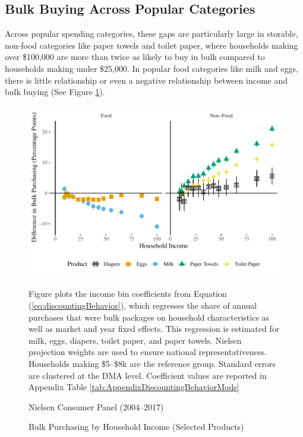 \documentclass[AER]{AEA_mal}
\begin{document}
\subsection{Bulk Buying Across Popular Categories}
\label{appendix:bulkGapCategories}

Across popular spending categories, these gaps are particularly large in storable, non-food categories like paper towels and toilet paper, where households making over \$100,000 are more than twice as likely to buy in bulk compared to households making under \$25,000. In popular food categories like milk and eggs, there is little relationship or even a negative relationship between income and bulk buying (See Figure \ref{fig:savingsBehaviorModules}).

\begin{figure}[!htb]
\centering
\caption{Bulk Purchasing by Household Income (Selected Products)}
\includegraphics[width = 4.8in, height = 3in]{../5_figures/savingsBehaviorModulesColor.pdf}
\begin{figurenotes}
Figure plots the income bin coefficients from Equation (\ref{eq:discountingBehavior}), which regresses the share of annual purchases that were bulk packages on household characteristics as well as market and year fixed effects. This regression is estimated for milk, eggs, diapers, toilet paper, and paper towels. Nielsen projection weights are used to ensure national representativeness. Households making \$5--\$8k are the reference group. Standard errors are clustered at the DMA level. Coefficient values are reported in Appendix Table \ref{tab:AppendixDiscountingBehaviorMods}
\end{figurenotes}
\begin{figurenotes}[Source]
Nielsen Consumer Panel (2004--2017)
\end{figurenotes}
\label{fig:savingsBehaviorModules}
\end{figure}
\end{document}
